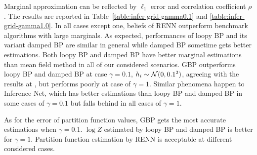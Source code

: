\begin{sidewaystable}[ph!]
\begin{center}
\begin{small}
\begin{tabular}{lcccccccc}



          

          \bottomrule
        \end{tabular}
      
    \end{small}
  \end{center}
\end{sidewaystable}

Marginal approximation can be reflected by $\ell_1$ error and correlation coefficient $\rho$. The results are reported in Table~\ref{table:infer-grid-gamma0.1} and \ref{table:infer-grid-gamma1.0}. In all cases except one, beliefs of RENN outperform benchmark algorithms with large marginals. As expected, performances of loopy BP and its variant damped BP are similar in general while damped BP sometime gets better estimations. Both loopy BP and damped BP have better marginal estimations than mean field method in all of our considered scenarios. GBP outperforms loopy BP and damped BP at case $\gamma=0.1$, $h_i\sim \mathcal{N}(0,0.1^2)$, agreeing with the results at \cite{yedida2005constucting}, but performs poorly at case of $\gamma=1$. Similar phenomena happen to Inference Net, which has better estimations than loopy BP and damped BP in some cases of $\gamma=0.1$ but falls behind in all cases of $\gamma=1$.


As for the error of partition function values, GBP gets the most accurate estimations when $\gamma=0.1$. $\log{Z}$ estimated by loopy BP and damped BP is better for $\gamma=1$. Partition function estimation by RENN is acceptable at different considered cases.

